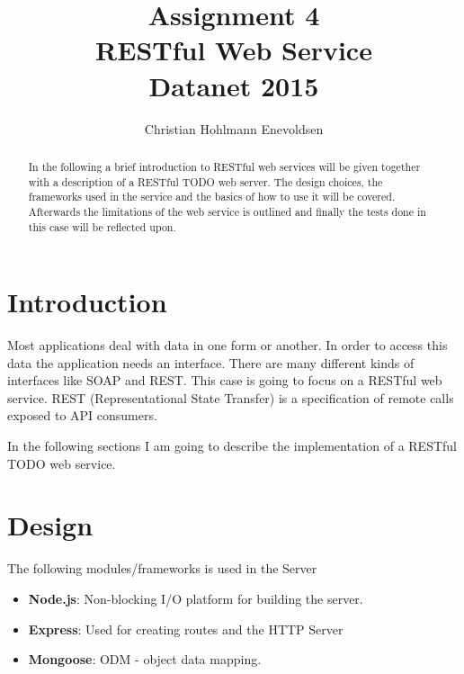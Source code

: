 \documentclass[a4paper,danish]{dnacm} %
\begin{document}
\title{Assignment 4 \\ RESTful Web Service \\ Datanet 2015} %

\author{Christian Hohlmann Enevoldsen
}



\maketitle

\begin{abstract}
In the following a brief introduction to RESTful web services will be given together with a description of a RESTful TODO web server. The design choices, the frameworks used in the service and the basics of how to use it will be covered.
Afterwards the limitations of the web service is outlined and
finally the tests done in this case will be reflected upon. 
\end{abstract}

\section{Introduction}
Most applications deal with data in one form or another. In order to access this data the application needs an interface. There are many different kinds of interfaces like SOAP and REST. This case is going to focus on a RESTful web service. REST (Representational State Transfer) is a specification of remote calls exposed to API consumers. 

In the following sections I am going to describe the implementation of a RESTful TODO web service.

\section{Design}

The following modules/frameworks is used in the Server

\begin{itemize}
\item{\textbf{Node.js}: Non-blocking I/O platform for building the server. }
\item{\textbf{Express}: Used for creating routes and the HTTP Server}
\item{\textbf{Mongoose}: ODM - object data mapping. }
\end{itemize} 
\end{document}
